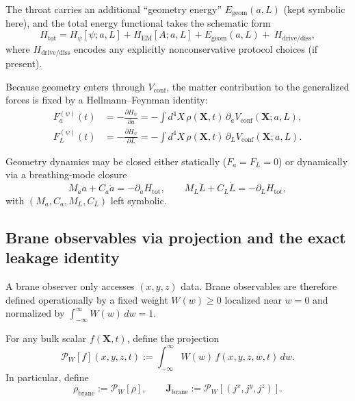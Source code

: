 \documentclass[11pt]{article}
\begin{document}
The throat carries an additional ``geometry energy'' $E_{\mathrm{geom}}(a,L)$ (kept symbolic here),
and the total energy functional takes the schematic form
\begin{equation}
H_{\mathrm{tot}}
=
H_{\psi}[\psi;a,L]
+
H_{\mathrm{EM}}[A;a,L]
+
E_{\mathrm{geom}}(a,L)
+\;H_{\mathrm{drive/diss}},
\label{eq:recap_total_energy}
\end{equation}
where $H_{\mathrm{drive/diss}}$ encodes any explicitly nonconservative protocol choices (if present).

Because geometry enters through $V_{\mathrm{conf}}$, the matter contribution to the generalized forces is fixed by a Hellmann--Feynman identity:
\begin{equation}
\boxed{
\begin{aligned}
F_a^{(\psi)}(t) &= -\frac{\partial H_\psi}{\partial a}
= -\int d^4X\,\rho(\mathbf{X},t)\,\partial_a V_{\mathrm{conf}}(\mathbf{X};a,L),\\
F_L^{(\psi)}(t) &= -\frac{\partial H_\psi}{\partial L}
= -\int d^4X\,\rho(\mathbf{X},t)\,\partial_L V_{\mathrm{conf}}(\mathbf{X};a,L).
\end{aligned}
}
\label{eq:recap_force_ledger}
\end{equation}

Geometry dynamics may be closed either statically ($F_a=F_L=0$) or dynamically via a breathing-mode closure
\begin{equation}
M_a\ddot a + C_a\dot a = -\partial_a H_{\mathrm{tot}},
\qquad
M_L\ddot L + C_L\dot L = -\partial_L H_{\mathrm{tot}},
\label{eq:recap_breathing_closure}
\end{equation}
with $(M_a,C_a,M_L,C_L)$ left symbolic.

\subsection{Brane observables via projection and the exact leakage identity}
\label{sec:recap_projection}

A brane observer only accesses $(x,y,z)$ data. Brane observables are therefore defined operationally by a fixed
weight $W(w)\ge 0$ localized near $w=0$ and normalized by $\int_{-\infty}^{\infty}W(w)\,dw=1$.

For any bulk scalar $f(\mathbf{X},t)$, define the projection
\begin{equation}
\mathcal{P}_W[f](x,y,z,t) := \int_{-\infty}^{\infty} W(w)\,f(x,y,z,w,t)\,dw.
\end{equation}
In particular, define
\begin{equation}
\boxed{
\rho_{\mathrm{brane}} := \mathcal{P}_W[\rho],
\qquad
\mathbf{J}_{\mathrm{brane}} := \mathcal{P}_W[(j^x,j^y,j^z)].
}
\label{eq:recap_brane_defs}
\end{equation}
\end{document}
